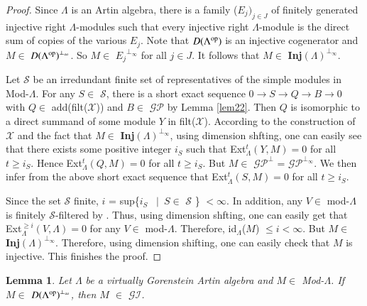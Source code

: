 \documentclass[11pt,a4paper]{article}
\newtheorem{lem}[thm]{Lemma}
\begin{document}
 \begin{proof}
Since  $\Lambda$ is an Artin algebra, there is a
family ($E_{j})_{j\in J}$ of finitely generated injective right  $\Lambda$-modules such that every injective right  $\Lambda$-module is the direct sum
of copies of the various $E_{j}$.
    Note that  $D(\Lambda^{{\rm op}})  $ is
an injective cogenerator and  $M \in $ ${D(\Lambda^{{\rm op}})}^{\perp_{\infty}} $.  So $M \in $  ${E_{j}}^{\perp_{\infty}}$  for all  $j \in J$. It follows that     $M \in $  {\bf Inj}$(\Lambda)^{\perp_{\infty}}$.


 Let $\mathscr{S}$ be an irredundant finite set   of representatives of the simple modules in Mod-$\Lambda$.  For any    $S\in $  $\mathscr{S}$,  there is a short exact sequence
$0\rightarrow  S    \rightarrow Q \rightarrow  B\rightarrow 0   $ with  $Q\in $    add(filt($\mathscr{X}$))   and   $B\in $  $\mathscr{GP}$ by  Lemma  \ref{lem22}.
Then $Q$ is  isomorphic to a  direct summand of some module $Y$  in
 filt($\mathscr{X}$). According to the construction of $\mathscr{X}$ and the fact that $M \in $  {\bf Inj}$(\Lambda)^{\perp_{\infty}}$,  using dimension shfting, one can easily see that
there exists some positive integer $i_{S}$ such that   {\rm Ext}$ _{\Lambda}^{t}(Y, M)=0$  for all  $t \geq i_{S}$. Hence   {\rm Ext}$ _{\Lambda}^{t}(Q, M)=0$  for all  $t \geq i_{S}$.
But $M \in $  $\mathscr{GP}^\perp$ = $ {\mathscr {GP}}^{\perp_{\infty}}$. We then infer from the above short exact sequence that  {\rm Ext}$ _{\Lambda}^{t}(S, M)=0$  for all  $t \geq i_{S}$.

Since the set   $\mathscr{S}$ finite,   $i$ = sup\{$i_{S}$ \ $|$\   $S\in $  $\mathscr{S}$ \} $  < \infty$. In addition,  any $V \in$ {\rm mod}-$\Lambda$
 is  finitely  $\mathscr{S}$-filtered by \cite[Proposition
11.1]{and}. Thus, using dimension shfting, one can easily get that  {\rm Ext}$ _{\Lambda}^{\geq i}(V, \Lambda)=0$  for any
$V \in$ {\rm mod}-$\Lambda$. Therefore, {\rm id}$_{\Lambda}$($M$) $\leq i <\infty$.
But   $M \in $  {\bf Inj}$(\Lambda)^{\perp_{\infty}}$. Therefore, using dimension shifting, one can easily check that  $M $ is injective.  This   finishes  the proof.
 \end{proof}

\begin{lem}\label{lem82}   Let    $\Lambda$ be a virtually
Gorenstein Artin algebra and   $M\in $  {\rm Mod}-$\Lambda$. If   $M \in $ ${D(\Lambda^{{\rm op}})}^{\perp_{\infty}} $,
  then $M $   $\in $  $\mathscr{GI}$.\end{lem}
\end{document}
